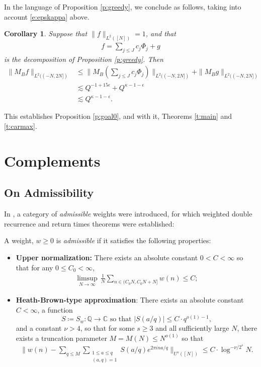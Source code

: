\documentclass[12pt]{amsart}
\numberwithin{equation}{section}
\newtheorem{cor}[theorem]{Corollary}
\theoremstyle{definition}
\begin{document}
In the language of Proposition \ref{p:greedy}, we conclude as follows, taking into account \eqref{e:epskappa} above. 
\begin{cor}
    Suppose that $\| f \|_{L^2([N])} = 1$, and that
        \begin{align}
        f = \sum_{j \leq J} c_j \Phi_j + g
    \end{align}
    is the decomposition of Proposition \ref{p:greedy}.
    Then
    \begin{align}
      \| M_B f \|_{L^2((-N,2N])} &\leq   \| M_B ( \sum_{j \leq J} c_j \Phi_j ) \|_{L^2((-N,2N])} + \| M_B g \|_{L^2((-N,2N])} \\
      &\lesssim Q^{-1+15\epsilon} + Q^{\kappa - 1- \epsilon} \\
      & \lesssim Q^{\kappa - 1 -\epsilon}.
    \end{align}
\end{cor}
This establishes Proposition \ref{p:goal0}, and with it, Theorems \ref{t:main} and \ref{t:carmax}.


\appendix

\section{Complements}\label{a:comp}



\subsection{On Admissibility}
In \cite{FKT1,FKT2}, a category of \emph{admissible} weights were introduced, for which weighted double recurrence and return times theorems were established:


A weight, $w \geq 0$ is \emph{admissible} if it satisfies the following properties:

    \begin{itemize}
        \item \textbf{Upper normalization:} There exists an absolute constant $0 < C < \infty$ so that for any $0 \leq C_0 < \infty$, 
    \begin{align}
        \limsup_{N \to \infty} \, \frac{1}{N} \sum_{n \in (C_0N,C_0N +N]} w(n) \leq C;
    \end{align}
        \item \textbf{Heath-Brown-type approximation}: There exists an absolute constant $C < \infty$, a function 
        \[ S \coloneqq S_w \colon \mathbb{Q} \to \mathbb{C} \text{ so that } |S(a/q)| \leq C \cdot q^{o(1)-1},\]
        and a constant $\nu > 4$, so that for some $s \geq 3$ and all sufficiently large $N$, there exists a truncation parameter $M = M(N) \leq N^{o(1)}$ so that
        \begin{align}
            \big\| w(n) - \sum_{q\leq M}\sum_{\substack{1\leq a\leq q\\ (a,q)=1}} S(a/q) e^{2 \pi i n a/q} \big\|_{U^s([N])} \leq C \cdot \log^{-\nu/2^s} N.
        \end{align}
    \end{itemize}
\end{document}

